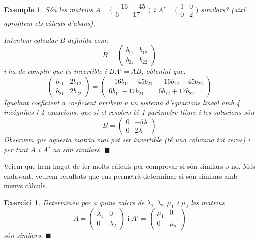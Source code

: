 \documentclass[
  11pt,
]{book}
\numberwithin{dummy}{section}
\theoremstyle{maincolornumbox}
\newtheorem{exerciseT}{Exercici}[chapter]
\theoremstyle{blacknumex}
\newtheorem{exampleT}{Exemple}[chapter]
\theoremstyle{blacknumbox}
\theoremstyle{maincolornum}
\newenvironment{exercise}{\begin{eBox}\begin{exerciseT}}{\hfill{\color{maincolor}\tiny\ensuremath{\blacksquare}}\end{exerciseT}\end{eBox}}
\newenvironment{example}{\begin{exampleT}}{\hfill{\tiny\ensuremath{\blacksquare}}\end{exampleT}}
\begin{document}
\begin{example}
Són les matrius
\(A=\big(\begin{smallmatrix}  -16 & -45 \\ 6 & 17\end{smallmatrix}\big)\)
i \(A'=\big(\begin{smallmatrix} 1 & 0 \\ 0 & 2  \end{smallmatrix}\big)\)
similars? (així aprofitem els càlculs d'abans).

Intentem calcular \(B\) definida com:
\[B=\begin{pmatrix} b_{11} & b_{12} \\ b_{21} & b_{22} \end{pmatrix}\] i
ha de complir que és invertible i \(BA'=AB\), obtenint que:
\[\begin{pmatrix}
    b_{11} & 2b_{12} \\ b_{21} & 2b_{22}
    \end{pmatrix}
    =
    \begin{pmatrix}
    -16b_{11}-45b_{21} & -16b_{12}-45b_{22}\\ 6b_{11}+17b_{21} & 6b_{12}+17b_{22}
    \end{pmatrix}\] Igualant coeficient a coeficient arribem a un
sistema d'equacions lineal amb 4 incògnites i 4 equacions, que si el
resolem té 1 paràmetre lliure i les solucions són \[B=\begin{pmatrix}
    0 & -5\lambda \\  0 & 2\lambda 
    \end{pmatrix}\] Observem que aquesta matriu mai pot ser invertible
(té una columna tot zeros) i per tant \(A\) i \(A'\) no són similars.
\end{example}

Veiem que hem hagut de fer molts càlculs per comprovar si són similars o
no. Més endavant, veurem resultats que ens permetrà determinar si són
similars amb menys càlculs.

\begin{exercise}
Determineu per a quins valors de \(\lambda_1, \lambda_2, \mu_1\) i \(\mu_2\)
les matrius \[A=\begin{pmatrix}
    \lambda_1 & 0 \\ 0 & \lambda_2
    \end{pmatrix}
    \text{ i }
    A'=\begin{pmatrix}
    \mu_1 & 0 \\ 0 & \mu_2
    \end{pmatrix}\] són similars.
\end{exercise}
\end{document}
